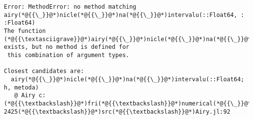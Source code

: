 \documentclass[12pt,a4paper]{article}
\begin{document}
\begin{lstlisting}
Error: MethodError: no method matching airy(*@{{\_}}@*)nicle(*@{{\_}}@*)na(*@{{\_}}@*)intervalu(::Float64, :
:Float64)
The function (*@{{\textasciigrave}}@*)airy(*@{{\_}}@*)nicle(*@{{\_}}@*)na(*@{{\_}}@*)intervalu(*@{{\textasciigrave}}@*) exists, but no method is defined for
 this combination of argument types.

Closest candidates are:
  airy(*@{{\_}}@*)nicle(*@{{\_}}@*)na(*@{{\_}}@*)intervalu(::Float64; h, metoda)
   @ Airy c:(*@{{\textbackslash}}@*)fri(*@{{\textbackslash}}@*)numerical(*@{{\_}}@*)math(*@{{\textbackslash}}@*)hws(*@{{\textbackslash}}@*)hw3(*@{{\_}}@*)actual(*@{{\textbackslash}}@*)nummat-2425(*@{{\textbackslash}}@*)src(*@{{\textbackslash}}@*)Airy.jl:92
\end{lstlisting}
\end{document}
